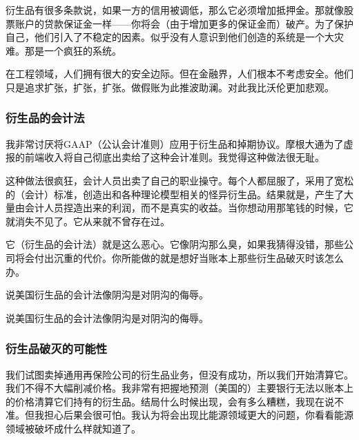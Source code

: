 衍生品有很多条款说，如果一方的信用被调低，那么它必须增加抵押金。那就像股票账户的贷款保证金一样——你将会（由于增加更多的保证金而）破产。为了保护自己，他们引入了不稳定的因素。似乎没有人意识到他们创造的系统是一个大灾难。那是一个疯狂的系统。
\par

在工程领域，人们拥有很大的安全边际。但在金融界，人们根本不考虑安全。他们只是追求扩张，扩张，扩张。做假账为此推波助澜。对此我比沃伦更加悲观。
\par

\subsubsection*{衍生品的会计法}

我非常讨厌将GAAP（公认会计准则）应用于衍生品和掉期协议。摩根大通为了虚报的前端收入将自己彻底出卖给了这种会计准则。我觉得这种做法很无耻。
\par

这种做法很疯狂，会计人员出卖了自己的职业操守。每个人都屈服了，采用了宽松的（会计）标准，创造出和各种理论模型相关的怪异衍生品。结果就是，产生了大量由会计人员捏造出来的利润，而不是真实的收益。当你想动用那笔钱的时候，它就消失不见了。它从来就不曾存在过。
\par

它（衍生品的会计法）就是这么恶心。它像阴沟那么臭，如果我猜得没错，那些公司将会付出沉重的代价。你所能做的就是想好当账本上那些衍生品破灭时该怎么办。
\par

说美国衍生品的会计法像阴沟是对阴沟的侮辱。
\par

\begin{WisdomBox}
\par

说美国衍生品的会计法像阴沟是对阴沟的侮辱。
\par
\end{WisdomBox}

\subsubsection*{衍生品破灭的可能性}

我们试图卖掉通用再保险公司的衍生品业务，但没有成功，所以我们开始清算它。我们不得不大幅削减价格。我非常有把握地预测（美国的）主要银行无法以账本上的价格清算它们持有的衍生品。结局什么时候出现，会有多么糟糕，我现在说不准。但我担心后果会很可怕。我认为将会出现比能源领域更大的问题，你看看能源领域被破坏成什么样就知道了。
\par

